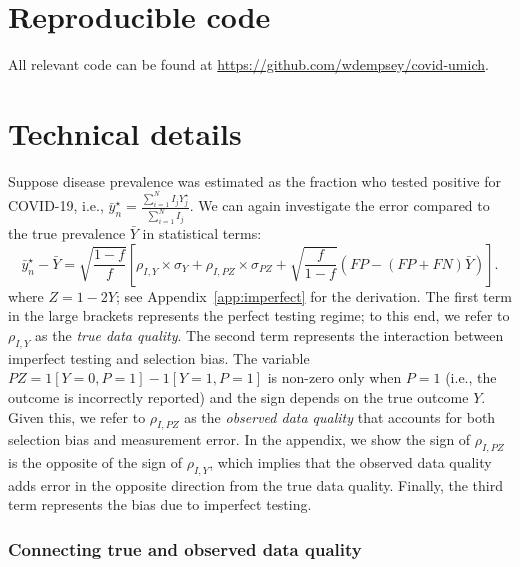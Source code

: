 \documentclass[11pt]{amsart}
\numberwithin{equation}{section}
\theoremstyle{plain}
\begin{document}



\newpage
\appendix

\section{Reproducible code}

All relevant code can be found at \url{https://github.com/wdempsey/covid-umich}.

\section{Technical details}

Suppose disease prevalence was estimated as the fraction who tested positive for COVID-19, i.e., $\bar y_n^\star = \frac{\sum_{i=1}^N I_j Y_j^\star}{\sum_{i=1}^N I_j}$.  We can again investigate the error compared to the true prevalence $\bar Y$ in statistical terms:
$$
\bar y_n^\star - \bar Y = \sqrt{\frac{1-f}{f}} \left[ \rho_{I,Y} \times \sigma_Y + \rho_{I,PZ} \times \sigma_{PZ} + \sqrt{\frac{f}{1-f}}  \left( FP - (FP+FN) \bar Y \right) \right] .
$$
where $Z = 1-2Y$; see Appendix~\ref{app:imperfect} for the derivation. The first term in the large brackets represents the perfect testing regime; to this end, we refer to $\rho_{I,Y}$ as the \emph{true data quality}.  The second term represents the interaction between imperfect testing and selection bias. The variable $PZ = 1[Y=0,P=1] - 1[Y=1, P=1]$ is non-zero only when $P=1$ (i.e., the outcome is incorrectly reported) and the sign depends on the true outcome $Y$.  Given this, we refer to $\rho_{I,PZ}$ as the \emph{observed data quality} that accounts for both selection bias and measurement error.  In the appendix, we show the sign of $\rho_{I,PZ}$ is the opposite of the sign of $\rho_{I,Y}$, which implies that the observed data quality adds error in the opposite direction from the true data quality.  Finally, the third term represents the bias due to imperfect testing.

\subsubsection{Connecting true and observed data quality}
\end{document}
